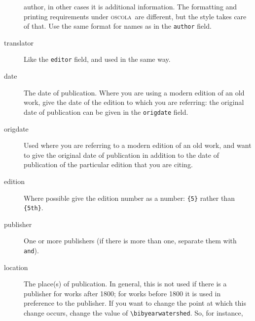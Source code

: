 \documentclass[a4paper,
               11pt,
	       DIV=1,			   
	       footinclude=false]
	      {scrartcl}
\newcommand{\oscolashort}{\textsc{oscola}\nocite{oscola}}
\begin{document}
\begin{description}
  author, in other cases it is additional information. The formatting
  and printing requirements under \oscolashort\ are different, but the
  style takes care of that. Use the same format for names as in the
  \texttt{author} field.
\item[translator]
  Like the \texttt{editor} field, and used in the same
  way.
\item[date]
  The date of publication. Where you are using a modern edition of an old work, give the date of the edition to which you are referring: the original date of publication can be given in the \texttt{origdate} field.
\item[origdate]
  Used where you are referring to a modern edition of an
  old work, and want to give the original date of publication in
  addition to the date of publication of the particular edition that
  you are citing.
\item[edition]
  Where possible give the edition number as a number:
  \texttt{\{5\}} rather than \texttt{\{5th\}}.
\item[publisher]
  One or more publishers (if there is more than one,
  separate them with \texttt{and}).
\item[location]
  The place(s) of publication. In general, this is not
  used if there is a publisher for works after 1800; for works
  before 1800 it is used in preference to the publisher. If you want
  to change the point at which this change occurs, change the value of
  \verb|\bibyearwatershed|. So, for
  instance,
  \begin{verbatim}

\end{verbatim}
\end{description}
\end{document}

